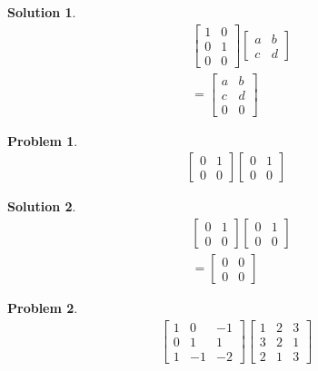 \documentclass{article}
\newtheorem{problem}{Problem}
\newtheorem*{solution}{Solution}
\begin{document}
\begin{solution}
\begin{align*}
& \begin{bmatrix}
1 & 0 \\ 0 & 1 \\ 0 & 0 
\end{bmatrix}
\begin{bmatrix}
a & b \\ c & d
\end{bmatrix} \\
&= \begin{bmatrix}
a & b \\ c & d \\ 0 & 0 
\end{bmatrix}
\end{align*}
\end{solution}

\begin{problem}
\begin{align*}
\begin{bmatrix}
0 & 1 \\ 0 & 0 
\end{bmatrix}
\begin{bmatrix}
0 & 1 \\ 0 & 0 
\end{bmatrix}
\end{align*}
\end{problem}

\begin{solution}
\begin{align*}
& \begin{bmatrix}
0 & 1 \\ 0 & 0 
\end{bmatrix}
\begin{bmatrix}
0 & 1 \\ 0 & 0 
\end{bmatrix} \\
&= \begin{bmatrix}
0 & 0 \\ 0 & 0 
\end{bmatrix}
\end{align*}
\end{solution}

\begin{problem}
\begin{align*}
\begin{bmatrix}
1 & 0 & -1 \\ 0 & 1 & 1 \\ 1 & -1 & -2
\end{bmatrix}
\begin{bmatrix}
1 & 2 & 3 \\ 3 & 2 & 1 \\ 2 & 1 & 3 
\end{bmatrix}
\end{align*}
\end{problem}
\end{document}
